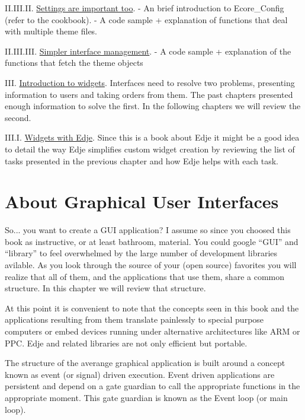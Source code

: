\documentclass[12pt,a4paper,english]{book}
\begin{document}
II.III.II. \href{\#settings-are-important-too}{Settings are important too}.
- An brief introduction to Ecore{\_}Config (refer to the cookbook).
- A code sample + explanation of functions that deal with multiple theme files.

II.III.III. \href{\#simpler-interface-management}{Simpler interface management}.
- A code sample + explanation of the functions that fetch the theme objects

III. \href{\#introduction-to-widgets}{Introduction to widgets}.
Interfaces need to resolve two problems, presenting information to users and
taking orders from them. The past chapters presented enough information to
solve the first. In the following chapters we will review the second.

III.I. \href{\#widgets-with-edje}{Widgets with Edje}.
Since this is a book about Edje it might be a good idea to detail the way Edje
simplifies custom widget creation by reviewing the list of tasks presented in
the previous chapter and how Edje helps with each task.



\hypertarget{about-graphical-user-interfaces}{}
\chapter{About Graphical User Interfaces}
\label{about-graphical-user-interfaces}

So... you want to create a GUI application? I assume so since you choosed this
book as instructive, or at least bathroom, material. You could google ``GUI'' and
``library'' to feel overwhelmed by the large number of development libraries
avilable. As you look through the source of your (open source) favorites you
will realize that all of them, and the applications that use them, share a
common structure. In this chapter we will review that structure.

At this point it is convenient to note that the concepts seen in this book and
the applications resulting from them translate painlessly to special purpose
computers or embed devices running under alternative architectures like ARM or
PPC. Edje and related libraries are not only efficient but portable.

The structure of the averange graphical application is built around a concept
known as event (or signal) driven execution. Event driven applications are
persistent and depend on a gate guardian to call the appropriate functions in
the appropriate moment. This gate guardian is known as the Event loop (or main
loop).
\end{document}
